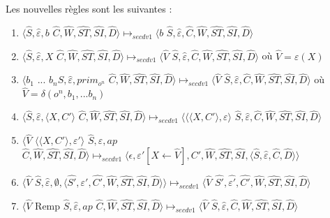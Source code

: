 \documentclass[10pt,a4paper]{article}
\begin{document}
					
					Les nouvelles règles sont les suivantes :
					\smallbreak
					\begin{enumerate}
					\item $\langle\widehat{S},\widehat{\varepsilon},b$ $\widehat{C},\widehat{W},\widehat{ST},\widehat{SI},\widehat{D}\rangle \longmapsto_{secdv1} \langle b$ $\widehat{S},\widehat{\varepsilon},\widehat{C},\widehat{W},\widehat{ST},\widehat{SI},\widehat{D}\rangle$
					\item $\langle\widehat{S},\widehat{\varepsilon},X$ $\widehat{C},\widehat{W},\widehat{ST},\widehat{SI},\widehat{D}\rangle \longmapsto_{secdv1} \langle \widehat{V}$ $\widehat{S},\widehat{\varepsilon},\widehat{C},\widehat{W},\widehat{ST},\widehat{SI},\widehat{D}\rangle$ où $\widehat{V} = \varepsilon(X)$
					\item $\langle b_{1}$ $...$ $b_{n}\widehat{S},\widehat{\varepsilon},prim_{o^{n}}$ $\widehat{C},\widehat{W},\widehat{ST},\widehat{SI},\widehat{D}\rangle \longmapsto_{secdv1} \langle \widehat{V}$ $\widehat{S},\widehat{\varepsilon},\widehat{C},\widehat{W},\widehat{ST},\widehat{SI},\widehat{D}\rangle$ où $\widehat{V} = \delta(o^{n},b_1,...b_{n})$
					\item $\langle\widehat{S},\widehat{\varepsilon},\langle X,C'\rangle$ $\widehat{C},\widehat{W},\widehat{ST},\widehat{SI},\widehat{D}\rangle \longmapsto_{secdv1} \langle\langle\langle X,C'\rangle,\varepsilon\rangle$ $\widehat{S},\widehat{\varepsilon},\widehat{C},\widehat{W},\widehat{ST},\widehat{SI},\widehat{D}\rangle$
					\item $\langle\widehat{V}$ $\langle\langle X,C'\rangle,\varepsilon'\rangle$ $\widehat{S},\widehat{\varepsilon},ap$ $\widehat{C},\widehat{W},\widehat{ST},\widehat{SI},\widehat{D}\rangle \longmapsto_{secdv1} \langle\epsilon,\varepsilon'[X \leftarrow \widehat{V}],C',\widehat{W},\widehat{ST},\widehat{SI},\langle\widehat{S},\widehat{\varepsilon},\widehat{C},\widehat{D}\rangle\rangle$
					\item $\langle\widehat{V}$ $\widehat{S},\widehat{\varepsilon},\emptyset,\langle\widehat{S'},\widehat{\varepsilon'},\widehat{C'},\widehat{W},\widehat{ST},\widehat{SI},\widehat{D}\rangle\rangle \longmapsto_{secdv1} \langle \widehat{V}$ $\widehat{S'},\widehat{\varepsilon'},\widehat{C'},\widehat{W},\widehat{ST},\widehat{SI},\widehat{D}\rangle$
					\item $\langle\widehat{V}$ Remp $\widehat{S},\widehat{\varepsilon},ap$ $\widehat{C},\widehat{W},\widehat{ST},\widehat{SI},\widehat{D}\rangle \longmapsto_{secdv1} \langle \widehat{V}$ $\widehat{S},\widehat{\varepsilon},\widehat{C},\widehat{W},\widehat{ST},\widehat{SI},\widehat{D}\rangle$

\end{enumerate}
\end{document}
